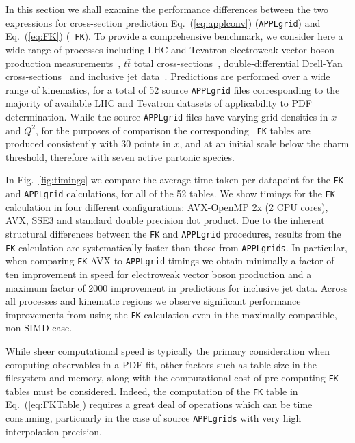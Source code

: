 \documentclass[preprint,12pt]{elsarticle}
\begin{document}
In this section we shall examine the performance differences between
the two expressions for cross-section prediction
Eq.~(\ref{eq:applconv}) ({\tt APPLgrid}) and Eq.~(\ref{eq:FK}) ({\tt
  FK}).
%
To provide a comprehensive benchmark, we consider here a wide range of
processes including LHC and Tevatron electroweak vector boson
production
measurements~\cite{Aaij:2012mda,Aaij:2012vn,Chatrchyan:2013mza,Chatrchyan:2013uja,Chatrchyan:2012xt,Aad:2013iua,Aad:2011fp,Aad:2011dm,Aaltonen:2010zza},
$t\bar{t}$ total
cross-sections~\cite{ATLAS:2012aa,ATLAS:2011xha,TheATLAScollaboration:2013dja,Chatrchyan:2013faa,Chatrchyan:2012bra,Chatrchyan:2012ria},
double-differential Drell-Yan
cross-sections~\cite{Chatrchyan:2013tia,CMS:2014jea} and inclusive jet
data~\cite{Chatrchyan:2012bja,Aad:2011fc,Aad:2013lpa,Abazov:2007jy}. Predictions
are performed over a wide range of kinematics, for a total of 52
source {\tt APPLgrid} files corresponding to the majority of available
LHC and Tevatron datasets of applicability to PDF determination.
While the source {\tt APPLgrid} files have varying grid densities in
$x$ and $Q^2$, for the purposes of comparison the corresponding {\tt
  FK} tables are produced consistently with 30 points in $x$, and at
an initial scale below the charm threshold, therefore with seven
active partonic species.

In Fig.~\ref{fig:timings} we compare the average time taken per
datapoint for the {\tt FK} and {\tt APPLgrid} calculations, for all of
the 52 tables. We show timings for the {\tt FK} calculation in four
different configurations: AVX-OpenMP 2x (2 CPU cores), AVX, SSE3 and
standard double precision dot product. Due to the inherent structural
differences between the {\tt FK} and {\tt APPLgrid} procedures,
results from the {\tt FK} calculation are systematically faster than
those from {\tt APPLgrids}.  In particular, when comparing {\tt FK}
AVX to {\tt APPLgrid} timings we obtain minimally a factor of ten
improvement in speed for electroweak vector boson production and a
maximum factor of 2000 improvement in predictions for inclusive jet
data. Across all processes and kinematic regions we observe
significant performance improvements from using the {\tt FK}
calculation even in the maximally compatible, non-SIMD case.

While sheer computational speed is typically the primary consideration
when computing observables in a PDF fit, other factors such as table
size in the filesystem and memory, along with the computational cost
of pre-computing {\tt FK} tables must be considered. Indeed, the
computation of the {\tt FK} table in Eq.~(\ref{eq:FKTable}) requires a
great deal of operations which can be time consuming, particuarly in
the case of source {\tt APPLgrids} with very high interpolation
precision.
\end{document}
